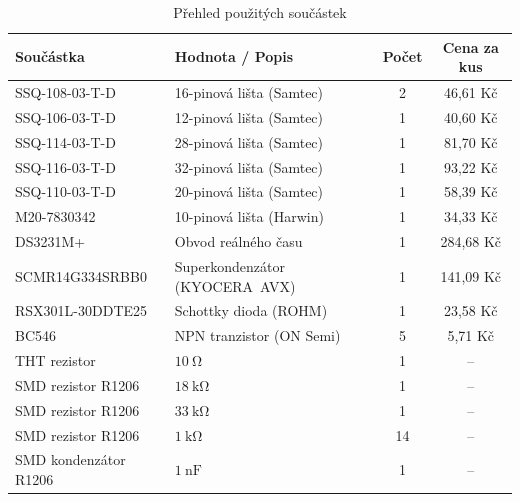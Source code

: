 \begin{table}[htbp]
    \centering
    \caption{Přehled použitých součástek}
    \label{tab:bom}
    \begin{tabularx}{\textwidth}{|X|X|c|c|}
        \hline
        \textbf{Součástka} & \textbf{Hodnota / Popis} & \textbf{Počet} & \textbf{Cena za kus} \\
        \hline
        SSQ-108-03-T-D      & 16-pinová lišta (Samtec)       & 2  & 46,61 Kč   \\ \hline
        SSQ-106-03-T-D      & 12-pinová lišta (Samtec)       & 1  & 40,60 Kč   \\ \hline
        SSQ-114-03-T-D      & 28-pinová lišta (Samtec)       & 1  & 81,70 Kč   \\ \hline
        SSQ-116-03-T-D      & 32-pinová lišta (Samtec)       & 1  & 93,22 Kč   \\ \hline
        SSQ-110-03-T-D      & 20-pinová lišta (Samtec)       & 1  & 58,39 Kč   \\ \hline
        M20-7830342         & 10-pinová lišta (Harwin)       & 1  & 34,33 Kč   \\ \hline
        DS3231M+            & Obvod reálného času             & 1  & 284,68 Kč  \\ \hline
        SCMR14G334SRBB0     & Superkondenzátor (\mbox{KYOCERA AVX})  & 1  & 141,09 Kč  \\ \hline
        RSX301L-30DDTE25    & Schottky dioda (ROHM)           & 1  & 23,58 Kč   \\ \hline
        BC546               & NPN tranzistor (ON Semi)        & 5  & 5,71 Kč    \\ \hline
        THT rezistor        & $\SI{10}{\ohm}$                 & 1  & --         \\ \hline
        SMD rezistor R1206  & $\SI{18}{\kilo\ohm}$            & 1  & --         \\ \hline
        SMD rezistor R1206  & $\SI{33}{\kilo\ohm}$            & 1  & --         \\ \hline
        SMD rezistor R1206  & $\SI{1}{\kilo\ohm}$             & 14 & --         \\ \hline
        SMD kondenzátor R1206  & $\SI{1}{\nano\farad}$        & 1  & --         \\ \hline
    \end{tabularx}
\end{table}

\newpage

